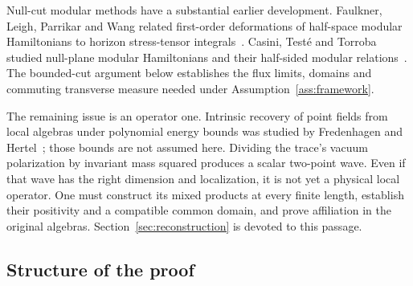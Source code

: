 Null-cut modular methods have a substantial earlier development. Faulkner, Leigh, Parrikar and Wang related first-order deformations of half-space modular Hamiltonians to horizon stress-tensor integrals~\cite{FaulknerLeighParrikarWang2016}. Casini, Test\'e and Torroba studied null-plane modular Hamiltonians and their half-sided modular relations~\cite{CasiniTesteTorroba2017}. The bounded-cut argument below establishes the flux limits, domains and commuting transverse measure needed under Assumption~\ref{ass:framework}.

The remaining issue is an operator one. Intrinsic recovery of point
fields from local algebras under polynomial energy bounds was studied
by Fredenhagen and Hertel~\cite{FredenhagenHertel1981}; those bounds
are not assumed here. Dividing the trace's vacuum
polarization by invariant mass squared produces a scalar two-point wave.
Even if that wave has the right dimension and localization, it is not yet
a physical local operator. One must construct its mixed products at every
finite length, establish their positivity and a compatible common domain,
and prove affiliation in the original algebras.
Section~\ref{sec:reconstruction} is devoted to this passage.

\subsection{Structure of the proof}

